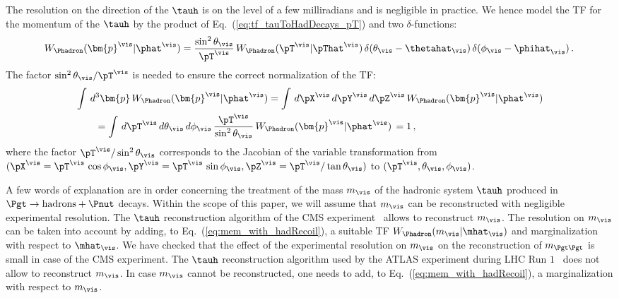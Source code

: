 The resolution on the direction of the $\tauh$ is on the level
of a few milliradians and is negligible in practice.
We hence model the TF for the momentum of the $\tauh$ by the product of Eq.~(\ref{eq:tf_tauToHadDecays_pT}) and two
$\delta$-functions:
\begin{equation}
W_{\Phadron}( \bm{p}^{\vis} | \phat^{\vis} ) =
 \frac{\sin^{2}\theta_{\vis}}{\pT^{\vis}} \, 
  W_{\Phadron}( \pT^{\vis} | \pThat^{\vis} ) \,
  \delta( \theta_{\vis} - \thetahat_{\vis} ) \, 
  \delta( \phi_{\vis} - \phihat_{\vis} ) \, .
\label{eq:tf_tauToHadDecays}
\end{equation}
The factor $\sin^{2}\theta_{\vis}/\pT^{\vis}$ is needed
to ensure the correct normalization of the TF:
\begin{align}
& \int \, d^{3}\bm{p}  \, W_{\Phadron}( \bm{p}^{\vis} | \phat^{\vis} ) = \int \, d\pX^{\vis} \, d\pY^{\vis} \, d\pZ^{\vis} \, W_{\Phadron}( \bm{p}^{\vis} | \phat^{\vis} ) \nonumber \\
& \qquad = \int \, d\pT^{\vis} \, d\theta_{\vis} \, d\phi_{\vis} \,
\frac{\pT^{\vis}}{\sin^{2} \theta_{\vis}} \, W_{\Phadron}( \bm{p}^{\vis} | \phat^{\vis} ) \, 
  = 1 \, ,
\end{align}
where the factor $\pT^{\vis}/\sin^{2} \theta_{\vis}$ corresponds to the Jacobian of the variable transformation 
from $(\pX^{\vis} = \pT^{\vis} \, \cos\phi_{\vis}, \pY^{\vis} = \pT^{\vis} \, \sin\phi_{\vis}, \pZ^{\vis} = \pT^{\vis}/\tan\theta_{\vis})$ 
to $(\pT^{\vis}, \theta_{\vis}, \phi_{\vis})$.

A few words of explanation are in order concerning the treatment of
the mass $m_{\vis}$ of the hadronic system $\tauh$ produced in $\Pgt
\to \textrm{hadrons} + \Pnut$ decays.
Within the scope of this paper, we will assume that $m_{\vis}$ can be
reconstructed with negligible experimental resolution.
The $\tauh$ reconstruction algorithm of the CMS experiment~\cite{TAU-14-001} allows to
reconstruct $m_{\vis}$. The resolution on $m_{\vis}$ can be taken into
account by adding, to Eq.~(\ref{eq:mem_with_hadRecoil}), a suitable TF $W_{\Phadron}( m_{\vis} | \mhat_{\vis}
)$ and marginalization with respect to $\mhat_{\vis}$.
We have checked that the effect of the experimental resolution on
$m_{\vis}$ on the reconstruction of $m_{\Pgt\Pgt}$ is small in case of
the CMS experiment.
The $\tauh$ reconstruction algorithm used by the ATLAS experiment during LHC Run $1$~\cite{Aad:2014rga} does not
allow to reconstruct $m_{\vis}$.
In case $m_{\vis}$ cannot be reconstructed, one needs to add, to Eq.~(\ref{eq:mem_with_hadRecoil}),
a marginalization with respect to $m_{\vis}$.


